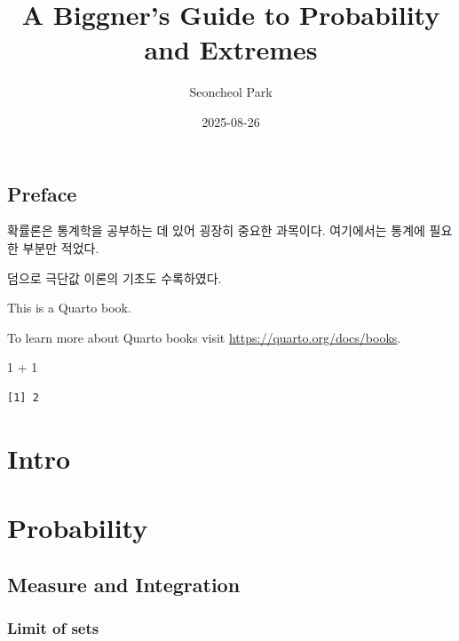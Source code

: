 \documentclass[
  letterpaper,
  DIV=11,
  numbers=noendperiod]{scrreprt}
\title{A Biggner's Guide to Probability and Extremes}
\author{Seoncheol Park}
\date{2025-08-26}
\newenvironment{Shaded}{\begin{snugshade}}{\end{snugshade}}
\newcommand{\DecValTok}[1]{\textcolor[rgb]{0.68,0.00,0.00}{#1}}
\newcommand{\SpecialCharTok}[1]{\textcolor[rgb]{0.37,0.37,0.37}{#1}}
\renewcommand*\contentsname{Table of contents}
\newcommand\contentsname{Table of contents}
\theoremstyle{definition}
\theoremstyle{plain}
\theoremstyle{plain}
\theoremstyle{definition}
\theoremstyle{plain}
\theoremstyle{definition}
\theoremstyle{remark}
\begin{document}
\maketitle


\renewcommand*\contentsname{Table of contents}
{
\hypersetup{linkcolor=}
\setcounter{tocdepth}{2}
\tableofcontents
}

\chapter*{Preface}\label{preface}


확률론은 통계학을 공부하는 데 있어 굉장히 중요한 과목이다. 여기에서는
통계에 필요한 부분만 적었다.

덤으로 극단값 이론의 기초도 수록하였다.

This is a Quarto book.

To learn more about Quarto books visit
\url{https://quarto.org/docs/books}.

\begin{Shaded}
\begin{Highlighting}[]
\DecValTok{1} \SpecialCharTok{+} \DecValTok{1}
\end{Highlighting}
\end{Shaded}

\begin{verbatim}
[1] 2
\end{verbatim}

\part{Intro}

\part{Probability}

\chapter{Measure and Integration}\label{sec-measure}

\section{Limit of sets}\label{limit-of-sets}
\end{document}
